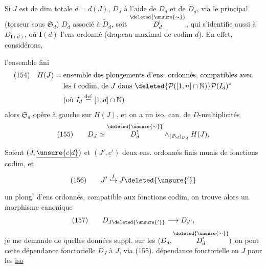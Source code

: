 Si $J$ est de dim totale $d=d(J)$,    $D_J$ à l'aide de $D_d$ et de $\widetilde D_d$, via le  principal (torseur sous $\mathfrak S_d$)  $D_d$ associé à $\widetilde D_d$, soit $\overset{\deleted{\unsure{\sim}}}{D^!_d}$, qui s'identifie aussi à $D_{\mathbf I(d)}$, où $\mathbf I(d)$ l'ens ordonné
(drapeau maximal de codim $d$). En effet, considérons,

l'ensemble fini
\[
\begin{aligned}
(154)\quad H(J)={}&\text{ensemble des plongements d'ens. ordonnés, compatibles avec}\\
&\text{les f codim, de }J\text{ dans }\deleted{\mathcal P([1,n]\cap\mathbb N)}\mathcal P(I_d)^\circ\\
&\text{(où }I_d\overset{\mathrm{def}}=[1,d]\cap\mathbb N\text{)}
\end{aligned}
\]
alors $\mathfrak S_d$ opère à gauche sur $H(J)$, et on a un iso. can. de $D$-multiplicités
\[
(155)\qquad D_J\simeq\overset{\deleted{\unsure{\sim}}}{D^!_d}\mathbin{\wedge}_{(\mathfrak S_d)_{D_d}}H(J),
\]

Soient  $(J,\underline{\unsure{c|d}})$ et $(J',\underline{c}')$ deux ens. ordonnés finis munis de fonctions codim, et
\[
(156)\qquad J'\mathrel{\overset{f}{\hookrightarrow}}J\deleted{\unsure{'}}
\]
un plong\textsuperscript{t} d'ens ordonnés, compatible aux fonctions codim, on trouve alors un  morphisme canonique
\[
(157)\qquad D_{J\deleted{\unsure{'}}}\longrightarrow D_{J'},
\]
je me demande  de quelles données suppl.  sur les $(D_d,\overset{\deleted{\unsure{\sim}}}{D^!_d})$ on peut  cette dépendance fonctorielle  $D_J$  à $J$, via (155).   dépendance fonctorielle en $J$ pour les \uline{iso}

